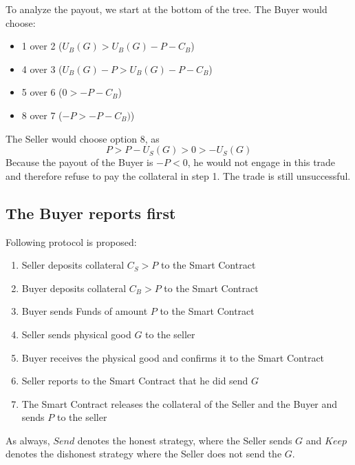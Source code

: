 \documentclass{cacthesis}
\begin{document}
To analyze the payout, we start at the bottom of the tree. The Buyer would choose:
\begin{itemize}
    \item 1 over 2 ($U_B(G) > U_B(G) -P -C_B$)
    \item 4 over 3 ($U_B(G) - P > U_B(G) -P -C_B$)
    \item 5 over 6 ($0 > -P -C_B$)
    \item 8 over 7 ($-P > -P -C_B)$)
\end{itemize}
The Seller would choose option 8, as 
\[P>P-U_S(G)>0>-U_S(G)\]
Because the payout of the Buyer is $-P<0$, he would not engage in this trade and therefore refuse to pay the collateral in step 1. The trade is still unsuccessful.

\subsection{The Buyer reports first}
Following protocol is proposed:
\begin{enumerate}
    \item Seller deposits collateral $C_S > P$ to the Smart Contract
    \item Buyer deposits collateral $C_B > P$ to the Smart Contract
    \item Buyer sends Funds of amount $P$ to the Smart Contract
    \item Seller sends physical good $G$ to the seller
    \item Buyer receives the physical good and confirms it to the Smart Contract
    \item Seller reports to the Smart Contract that he did send $G$
    \item The Smart Contract releases the collateral of the Seller and the Buyer and sends $P$ to the seller
\end{enumerate}
As always, $Send$ denotes the honest strategy, where the Seller sends $G$ and $Keep$ denotes the dishonest strategy where the Seller does not send the $G$.
\end{document}
